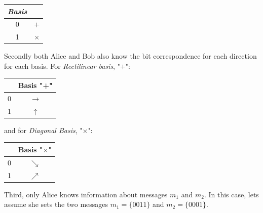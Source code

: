 \begin{table}[H]
\centering
\begin{tabular}{c|c}
\textbf{\textit{Basis}}         &  \\ \hline
 0 & $+$ \\
 1 & $\times$ \\
\end{tabular}
\end{table}

Secondly both Alice and Bob also know the bit correspondence for each direction for each basis. For \textit{Rectilinear basis}, "$+$":

\begin{table}[H]
\centering
\begin{tabular}{c|c}
            & Basis "+" \\ \hline
 0 & $\to$ \\
 1 & $\uparrow$ \\
\end{tabular}
\end{table}

and for \textit{Diagonal Basis}, "$\times$":

\begin{table}[H]
\centering
\begin{tabular}{c|c}
      & Basis "$\times$" \\ \hline
 0 & $\searrow$ \\
 1 & $\nearrow$ \\
\end{tabular}
\end{table}

Third, only Alice knows information about messages $m_{1}$ and $m_{2}$.
In this case, lets assume she sets the two messages $m_{1} = \{0 0 1 1\}$ and $m_{2} = \{0 0 0 1\}$.

